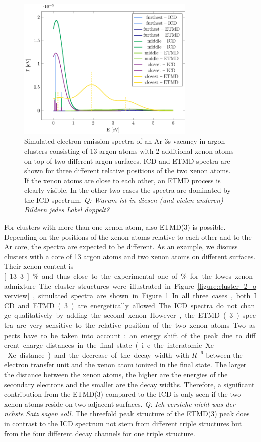 \begin{figure}[ht]
 \centering
 \includegraphics[width=8.5cm]{pics/2tops.pdf}
 \caption{Simulated electron emission spectra of an Ar 3s vacancy in 
          argon clusters consisting of 13
          argon atoms with 2 additional xenon atoms on top of two different
          argon surfaces. ICD and ETMD spectra are shown for three
          different relative positions of the two xenon atoms. If 
          the xenon atoms are close to each other, an ETMD process is
          clearly visible. In the other two cases the spectra are dominated by
          the ICD spectrum.
          {\it Q: Warum ist in diesen (und vielen anderen) Bildern jedes Label doppelt?}}
 \label{figure:2tops}
\end{figure}
%
For clusters with more than one xenon atom, also ETMD(3) is possible.
Depending on the positions of the xenon atoms relative to each other and to the Ar core, the spectra are expected to be different.
As an example, we discuss clusters with a core of 13 argon atoms and two xenon atoms on different surfaces. 
Their xenon content is \unit[13.3]{\%} and thus close to the experimental one of \unit[10-12]{\%} for the lowes xenon admixture.
The cluster structures were illustrated in Figure \ref{figure:cluster_2_overview}, simulated spectra are shown in Figure \ref{figure:2tops}.
In all three cases, both ICD and ETMD(3) are energetically allowed. The ICD
spectra do not change qualitatively by adding the second xenon.
However, the ETMD(3) spectra
are very sensitive to the relative position of the two xenon atoms.
Two aspects have to be taken into account: an energy shift of the peak due
to different charge distances in the final state (i.e. the interatomic Xe-Xe
distance) and the decrease of the decay width with $R^{-6}$
between the electron transfer unit and the xenon atom ionized in the final state.
The larger the distance between the xenon atoms, the higher are the energies
of the secondary electrons and the smaller are the decay widths. 
Therefore, a
significant contribution from the ETMD(3) compared to the ICD is only
seen if the two xenon atoms reside on two adjacent
surfaces. 
{\it Q: Ich verstehe nicht was der n\"chste Satz sagen soll.}
The threefold peak structure of the ETMD(3) peak does in contrast to
the ICD spectrum not stem from different triple structures but from the
four different decay channels for one triple structure.

